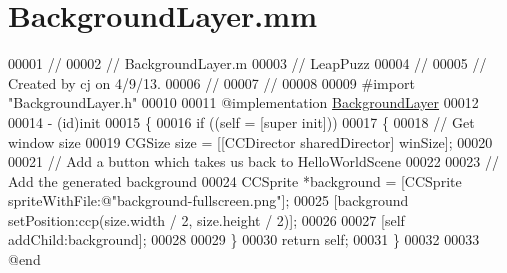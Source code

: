 \hypertarget{_background_layer_8mm}{\section{Background\-Layer.\-mm}
\label{db/d2a/_background_layer_8mm}
}

\begin{DoxyCode}
00001 \textcolor{comment}{//}
00002 \textcolor{comment}{//  BackgroundLayer.m}
00003 \textcolor{comment}{//  LeapPuzz}
00004 \textcolor{comment}{//}
00005 \textcolor{comment}{//  Created by cj on 4/9/13.}
00006 \textcolor{comment}{//}
00007 \textcolor{comment}{//}
00008 
00009 \textcolor{preprocessor}{#import "BackgroundLayer.h"}
00010 
00011 \textcolor{keyword}{@implementation }\hyperlink{interface_background_layer}{BackgroundLayer}
00012 
00014 - (id)init
00015 \{
00016     \textcolor{keywordflow}{if} ((\textcolor{keyword}{self} = [super init]))
00017     \{
00018         \textcolor{comment}{// Get window size}
00019         CGSize size = [[CCDirector sharedDirector] winSize];
00020         
00021         \textcolor{comment}{// Add a button which takes us back to HelloWorldScene}
00022         
00023         \textcolor{comment}{// Add the generated background}
00024         CCSprite *background = [CCSprite spriteWithFile:@"background-fullscreen.png"];
00025         [background setPosition:ccp(size.width / 2, size.height / 2)];
00026 
00027         [\textcolor{keyword}{self} addChild:background];
00028 
00029     \}
00030     \textcolor{keywordflow}{return} \textcolor{keyword}{self};
00031 \}
00032 
00033 \textcolor{keyword}{@end}
\end{DoxyCode}
